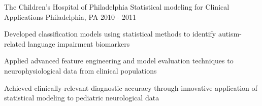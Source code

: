 \begin{cventries}
    \cventry
      {The Children's Hospital of Philadelphia} %
      {Statistical modeling for Clinical Applications} %
      {Philadelphia, PA} %
      {2010 - 2011} %
      {
        \begin{cvitems} %
          \item {Developed classification models using statistical methods to identify autism-related language impairment biomarkers}
          \item {Applied advanced feature engineering and model evaluation techniques to neurophysiological data from clinical populations}
          \item {Achieved clinically-relevant diagnostic accuracy through innovative application of statistical modeling to pediatric neurological data}
        \end{cvitems}
      }

  \end{cventries}
